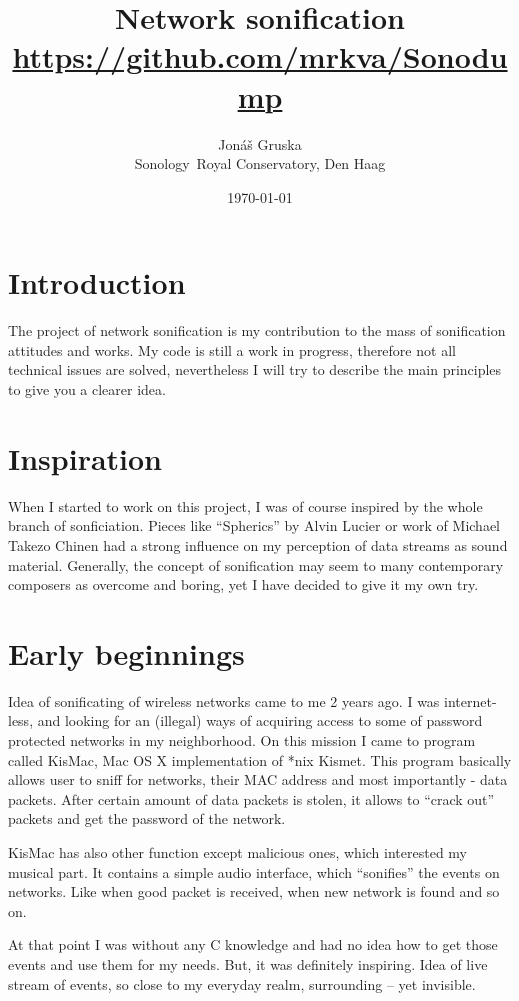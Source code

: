 \documentclass[11pt,a4paper,oneside]{article}
\title{Network sonification\\
			\small{\url{https://github.com/mrkva/Sonodump}}}
\author{Jonáš Gruska\\
	Sonology\
	Royal Conservatory, Den Haag}
\date{\today}
\begin{document}
\maketitle
\thispagestyle{empty}
\section{Introduction}
The project of network sonification is my contribution to the mass of sonification attitudes and works. My code is still a work in progress, therefore not all technical issues are solved, nevertheless I will try to describe the main principles to give you a clearer idea. 

\section{Inspiration}
When I started to work on this project, I was of course inspired by the whole branch of sonficiation. Pieces like ``Spherics'' by Alvin Lucier or work of Michael Takezo Chinen had a strong influence on my perception of data streams as sound material. Generally, the concept of sonification may seem to many contemporary composers as overcome and boring, yet I have decided to give it my own try.

\section{Early beginnings}
Idea of sonificating of wireless networks came to me 2 years ago. I was internet-less, and looking for an (illegal) ways of acquiring access to some of password protected networks in my neighborhood. On this mission I came to program called KisMac, Mac OS X implementation of *nix Kismet. This program basically allows user to sniff for networks, their MAC address and most importantly - data packets. After certain amount of data packets is stolen, it allows to ``crack out'' packets and get the password of the network.

KisMac has also other function except malicious ones, which interested my musical part. It contains a simple audio interface, which ``sonifies'' the events on networks. Like when good packet is received, when new network is found and so on.

At that point I was without any C knowledge and had no idea how to get those events and use them for my needs. But, it was definitely inspiring. Idea of live stream of events, so close to my everyday realm, surrounding -- yet invisible.
\end{document}
